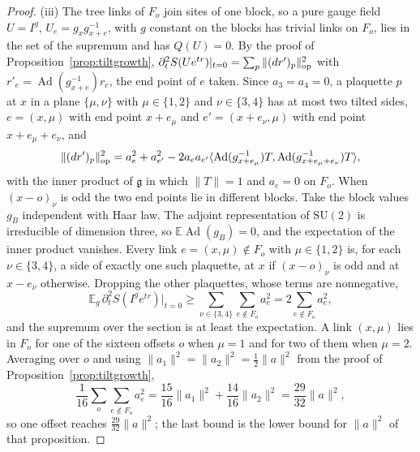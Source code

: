 \documentclass[11pt]{amsart}
\theoremstyle{definition}
\theoremstyle{remark}
\numberwithin{equation}{section}
\newcommand{\E}{\mathbb{E}}
\newcommand{\SU}{\mathrm{SU}}
\newcommand{\g}{\mathfrak{g}}
\newcommand{\ip}[2]{\langle #1,#2\rangle}
\begin{document}
\begin{proof}
(iii) The tree links of $F_o$ join sites of one block, so a pure gauge
field $U=I^g$, $U_e=g_xg_{x+e}^{-1}$, with $g$ constant on the blocks has
trivial links on $F_o$, lies in the set of the supremum and has $Q(U)=0$.
By the proof of Proposition~\ref{prop:tiltgrowth}, $\partial_t^2S(Ue^{tr}
)|_{t=0}=\sum_p\|(dr')_p\|_{\rm op}^2$ with $r'_e=\operatorname{Ad}(g_{x+e}
^{-1})r_e$, the end point of $e$ taken. Since $a_3=a_4=0$, a plaquette $p$
at $x$ in a plane $\{\mu,\nu\}$ with $\mu\in\{1,2\}$ and $\nu\in\{3,4\}$
has at most two tilted sides, $e=(x,\mu)$ with end point $x+e_\mu$ and
$e'=(x+e_\nu,\mu)$ with end point $x+e_\mu+e_\nu$, and
\[
\|(dr')_p\|_{\rm op}^2=a_e^2+a_{e'}^2-2a_ea_{e'}\ip{\operatorname{Ad}(g_{x
+e_\mu}^{-1})T}{\operatorname{Ad}(g_{x+e_\mu+e_\nu}^{-1})T},
\]
with the inner product of $\g$ in which $\|T\|=1$ and $a_e=0$ on $F_o$.
When $(x-o)_\nu$ is odd the two end points lie in different blocks. Take
the block values $g_B$ independent with Haar law. The adjoint
representation of $\SU(2)$ is irreducible of dimension three, so
$\E\operatorname{Ad}(g_B)=0$, and the expectation of the inner product
vanishes. Every link $e=(x,\mu)\notin F_o$ with $\mu\in\{1,2\}$ is, for
each $\nu\in\{3,4\}$, a side of exactly one such plaquette, at $x$ if
$(x-o)_\nu$ is odd and at $x-e_\nu$ otherwise. Dropping the other
plaquettes, whose terms are nonnegative,
\[
\E_g\,\partial_t^2S(I^ge^{tr})\big|_{t=0}\ge\sum_{\nu\in\{3,4\}}\sum_{e
\notin F_o}a_e^2=2\sum_{e\notin F_o}a_e^2,
\]
and the supremum over the section is at least the expectation. A link
$(x,\mu)$ lies in $F_o$ for one of the sixteen offsets $o$ when $\mu=1$
and for two of them when $\mu=2$. Averaging over
$o$ and using $\|a_1\|^2=\|a_2\|^2=\frac12\|a\|^2$ from the proof of
Proposition~\ref{prop:tiltgrowth},
\[
\frac1{16}\sum_o\sum_{e\notin F_o}a_e^2=\frac{15}{16}\|a_1\|^2+\frac{14}{16}
\|a_2\|^2=\frac{29}{32}\|a\|^2,
\]
so one offset reaches $\frac{29}{32}\|a\|^2$; the last bound is the lower
bound for $\|a\|^2$ of that proposition.
\end{proof}
\end{document}
